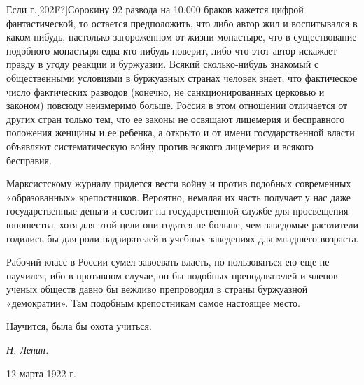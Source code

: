\documentclass[twoside]{article}
\begin{document}
Если г.\textlatin{[202F?]}Сорокину 92 развода на 10.000 браков кажется
цифрой фантастической, то остается предположить, что либо автор жил и
воспитывался в каком-нибудь, настолько загороженном от жизни монастыре, что
в существование подобного монастыря едва кто-нибудь поверит, либо что этот
автор искажает правду в угоду реакции и буржуазии. Всякий сколько-нибудь
знакомый с общественными условиями в буржуазных странах человек знает, что
фактическое число фактических разводов (конечно, не санкционированных
церковью и законом) повсюду неизмеримо больше. Россия в этом отношении
отличается от других стран только тем, что ее законы не освящают лицемерия
и бесправного положения женщины и ее ребенка, а открыто и от имени
государственной власти объявляют систематическую войну против всякого
лицемерия и всякого бесправия.

Марксистскому журналу придется вести войну и против подобных современных
«образованных» крепостников. Вероятно, немалая их часть получает у нас даже
государственные деньги и состоит на государственной службе для просвещения
юношества, хотя для этой цели они годятся не больше, чем заведомые
растлители годились бы для роли надзирателей в учебных заведениях для
младшего возраста.

Рабочий класс в России сумел завоевать власть, но пользоваться ею еще не
научился, ибо в противном случае, он бы подобных преподавателей и членов
ученых обществ давно бы вежливо препроводил в страны буржуазной
«демократии». Там подобным крепостникам самое настоящее место.

Научится, была бы охота учиться.

{\raggedleft
\textit{Н. Ленин.}
\par}

12 марта 1922 г.


\bigskip
\end{document}
